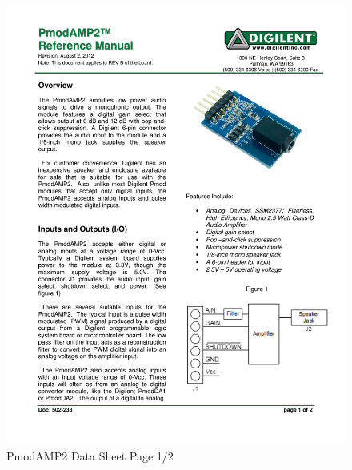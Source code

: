 \documentclass{article}
\begin{document}
	\begin{figure}[H]
	  	\centering
	  	\includegraphics[width=6.5in]{additionalDataSheets/PmodAMP2}
	  	\caption{PmodAMP2 Data Sheet Page 1/2}
	\end{figure}
\end{document}
